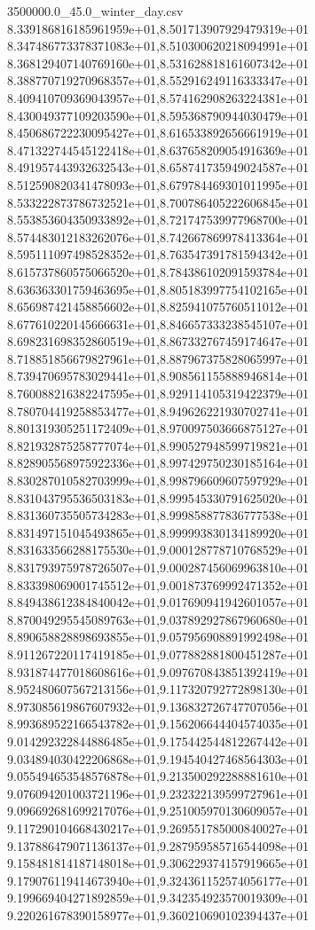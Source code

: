 \begin{filecontents*}{3500000.0_45.0_winter_day.csv}
8.339186816185961959e+01,8.501713907929479319e+01
8.347486773378371083e+01,8.510300620218094991e+01
8.368129407140769160e+01,8.531628818161607342e+01
8.388770719270968357e+01,8.552916249116333347e+01
8.409410709369043957e+01,8.574162908263224381e+01
8.430049377109203590e+01,8.595368790944030479e+01
8.450686722230095427e+01,8.616533892656661919e+01
8.471322744545122418e+01,8.637658209054916369e+01
8.491957443932632543e+01,8.658741735949024587e+01
8.512590820341478093e+01,8.679784469301011995e+01
8.533222873786732521e+01,8.700786405222606845e+01
8.553853604350933892e+01,8.721747539977968700e+01
8.574483012183262076e+01,8.742667869978413364e+01
8.595111097498528352e+01,8.763547391781594342e+01
8.615737860575066520e+01,8.784386102091593784e+01
8.636363301759463695e+01,8.805183997754102165e+01
8.656987421458856602e+01,8.825941075760511012e+01
8.677610220145666631e+01,8.846657333238545107e+01
8.698231698352860519e+01,8.867332767459174647e+01
8.718851856679827961e+01,8.887967375828065997e+01
8.739470695783029441e+01,8.908561155888946814e+01
8.760088216382247595e+01,8.929114105319422379e+01
8.780704419258853477e+01,8.949626221930702741e+01
8.801319305251172409e+01,8.970097503666875127e+01
8.821932875258777074e+01,8.990527948599719821e+01
8.828905568975922336e+01,8.997429750230185164e+01
8.830287010582703999e+01,8.998796609607597929e+01
8.831043795536503183e+01,8.999545330791625020e+01
8.831360735505734283e+01,8.999858877836777538e+01
8.831497151045493865e+01,8.999993830134189920e+01
8.831633566288175530e+01,9.000128778710768529e+01
8.831793975978726507e+01,9.000287456069963810e+01
8.833398069001745512e+01,9.001873769992471352e+01
8.849438612384840042e+01,9.017690941942601057e+01
8.870049295545089763e+01,9.037892927867960680e+01
8.890658828898693855e+01,9.057956908891992498e+01
8.911267220117419185e+01,9.077882881800451287e+01
8.931874477018608616e+01,9.097670843851392419e+01
8.952480607567213156e+01,9.117320792772898130e+01
8.973085619867607932e+01,9.136832726747707056e+01
8.993689522166543782e+01,9.156206644404574035e+01
9.014292322844886485e+01,9.175442544812267442e+01
9.034894030422206868e+01,9.194540427468564303e+01
9.055494653548576878e+01,9.213500292288881610e+01
9.076094201003721196e+01,9.232322139599727961e+01
9.096692681699217076e+01,9.251005970130609057e+01
9.117290104668430217e+01,9.269551785000840027e+01
9.137886479071136137e+01,9.287959585716544098e+01
9.158481814187148018e+01,9.306229374157919665e+01
9.179076119414673940e+01,9.324361152574056177e+01
9.199669404271892859e+01,9.342354923570019309e+01
9.220261678390158977e+01,9.360210690102394437e+01

\end{filecontents*}
